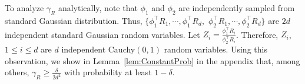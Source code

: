 \documentclass{article}
\newcommand{\Ephione}{\mathcal{E}_{\phi_1}}
\newcommand{\E}{\mathbb{E}}
\newtheorem{lemma}{Lemma}[section]
\theoremstyle{definition}
\newtheorem{remark}[lemma]{Remark}
\begin{document}




To analyze $\gamma_R$ analytically,
note that $\phi_1$ and $\phi_2$ are independently sampled from standard Gaussian distribution. 
Thus, $\{\phi_1^{\top}R_1, \cdots, \phi_1^{\top}R_d,$ $\phi_2^{\top}R_1, \cdots, \phi_2^{\top}R_d\}$ are $2d$ independent standard Gaussian random variables. 
Let $Z_i = \frac{\phi_1^{\top}R_i}{\phi_2^{\top}R_i}$. Therefore, $Z_i$, $1\le i\le d$ are $d$ independent Cauchy$(0,1)$ random variables. 
Using this observation, we show in Lemma~\ref{lem:ConstantProb} in the appendix that, among others,  $\gamma_R \ge\frac{\delta}{2d^2}$ with probability at least $1-\delta$.

\end{document}
